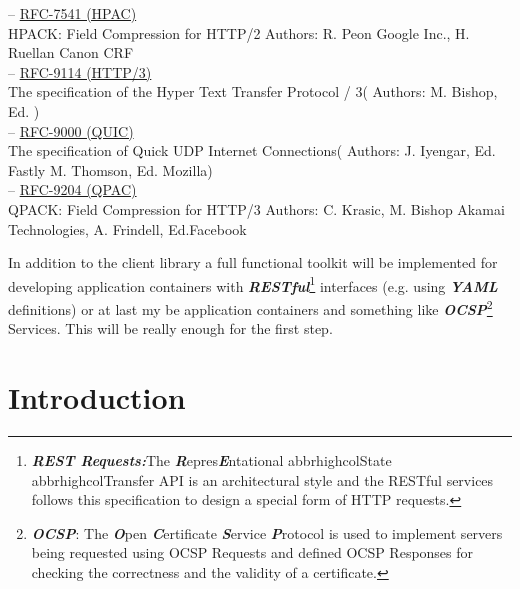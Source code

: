 \documentclass[10pt,a4paper,english]{article}
\newcommand{\abbrhighcol}[1]{\textbf{\textit{#1}}}
\begin{document}
\begin{multicols}{2}
\begin{flushleft}
\hspace*{1em}-- \href{https://www.rfc-editor.org/rfc/pdfrfc/rfc7541.txt.pdf}{RFC-7541 (HPAC)} \\HPACK: Field Compression for HTTP/2 Authors:  R. Peon Google Inc., H. Ruellan Canon CRF\\
\hspace*{1em}-- \href{https://www.rfc-editor.org/rfc/rfc9114.pdf}{RFC-9114 (HTTP/3)} \\The specification of the Hyper Text Transfer Protocol / 3( Authors: M. Bishop, Ed. ) \\
\hspace*{1em}-- \href{https://www.rfc-editor.org/rfc/rfc9000.pdf}{RFC-9000 (QUIC)} \\The specification of Quick UDP Internet Connections( Authors: J. Iyengar, Ed. Fastly
M. Thomson, Ed. Mozilla) \\
\hspace*{1em}-- \href{https://www.rfc-editor.org/rfc/rfc9204.pdf}{RFC-9204 (QPAC)} \\QPACK: Field Compression for HTTP/3 Authors: C. Krasic, M. Bishop Akamai Technologies,
A. Frindell, Ed.Facebook
\end{flushleft}
\begin{flushleft}
In addition to the client library a full  functional toolkit will be implemented for developing application containers with \abbrhighcol {RESTful}\footnote{\abbrhighcol {REST Requests:}The \abbrhighcol {R}epres\abbrhighcol  {E}ntational abbrhighcol{S}tate abbrhighcol{T}ransfer API is an architectural style and the RESTful services follows this specification to design a special form of HTTP requests.} interfaces (e.g. using \abbrhighcol {YAML} definitions) or at last my be application containers and something like \abbrhighcol {OCSP}\footnote{ \abbrhighcol {OCSP}: The \abbrhighcol  {O}pen \abbrhighcol {C}ertificate \abbrhighcol  {S}ervice \abbrhighcol  {P}rotocol is used to implement servers being requested using OCSP Requests and defined OCSP  Responses for checking the correctness and the validity of a certificate.} Services.
This will be really enough for the first step.
\end{flushleft}

\section{Introduction}


\end{multicols}
\end{document}
